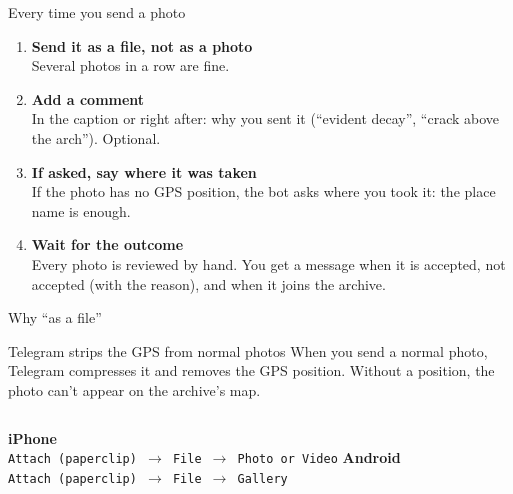 \documentclass[aspectratio=169,11pt]{beamer}
\newcommand{\tr}[2]{#2}
\newcommand{\tr}[2]{#1}
\newcommand{\passo}[2]{\item \textbf{#1}\\[1pt]{\small\color{muted}#2}\vspace{4pt}}
\begin{document}
\begin{frame}{\tr{Ogni volta che mandi una foto}{Every time you send a photo}}
  \begin{enumerate}
    \passo{\tr{Inviala come file, non come foto}{Send it as a file, not as a photo}}
         {\tr{Più foto di fila vanno bene.}{Several photos in a row are fine.}}
    \passo{\tr{Aggiungi un commento}{Add a comment}}
         {\tr{Nella didascalia o subito dopo: perché l'hai caricata («evidente stato di degrado», «fessura sopra l'arco»). Facoltativo.}
             {In the caption or right after: why you sent it (``evident decay'', ``crack above the arch''). Optional.}}
    \passo{\tr{Se serve, indica il luogo}{If asked, say where it was taken}}
         {\tr{Se la foto non contiene la posizione GPS, il bot ti chiede dove l'hai scattata: basta il nome del luogo.}
             {If the photo has no GPS position, the bot asks where you took it: the place name is enough.}}
    \passo{\tr{Aspetta l'esito}{Wait for the outcome}}
         {\tr{Ogni foto viene esaminata a mano. Ricevi un messaggio quando è accettata, non accettata (con il motivo)
              e quando entra nell'archivio.}
             {Every photo is reviewed by hand. You get a message when it is accepted, not accepted (with the reason),
              and when it joins the archive.}}
  \end{enumerate}
\end{frame}

\begin{frame}{\tr{Perché «come file»}{Why ``as a file''}}
  \begin{block}{\tr{Telegram cancella il GPS delle foto normali}{Telegram strips the GPS from normal photos}}
    \tr{Quando invii una foto normale, Telegram la comprime e cancella la posizione GPS.
        Senza posizione la foto non può comparire sulla mappa dell'archivio.}
       {When you send a normal photo, Telegram compresses it and removes the GPS position.
        Without a position, the photo can't appear on the archive's map.}
  \end{block}
  \vspace{0.4cm}
  \begin{columns}[t]
      \textbf{iPhone}\\[2pt]
      \texttt{\tr{Allegato (graffetta) $\rightarrow$ File $\rightarrow$ Scegli foto o video}
                 {Attach (paperclip) $\rightarrow$ File $\rightarrow$ Photo or Video}}
      \textbf{Android}\\[2pt]
      \texttt{\tr{Allegato (graffetta) $\rightarrow$ File $\rightarrow$ Galleria}
                 {Attach (paperclip) $\rightarrow$ File $\rightarrow$ Gallery}}
  \end{columns}
\end{frame}
\end{document}
